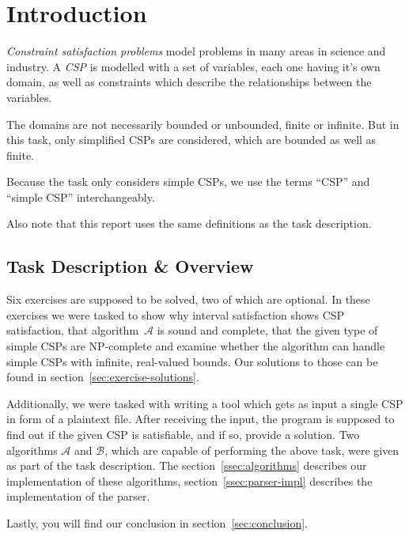 \section{Introduction}

\emph{Constraint satisfaction problems} model problems in many areas in science and industry.
A \emph{CSP} is modelled with a set of variables, each one having it's own domain, as well as constraints which describe the relationships between the variables.~\cite{MF19}

The domains are not necessarily bounded or unbounded, finite or infinite.
But in this task, only simplified CSPs are considered, which are bounded as well as finite.~\cite{MF19}

Because the task only considers simple CSPs, we use the terms ``CSP'' and ``simple CSP'' interchangeably.

Also note that this report uses the same definitions as the task description.

\subsection{Task Description \& Overview}

Six exercises are supposed to be solved, two of which are optional.
In these exercises we were tasked to show why interval satisfaction shows CSP satisfaction, that algorithm~$\mathcal{A}$ is sound and complete, that the given type of simple CSPs are NP-complete and examine whether the algorithm can handle simple CSPs with infinite, real-valued bounds.
Our solutions to those can be found in section~\ref{sec:exercise-solutions}.

Additionally, we were tasked with writing a tool which gets as input a single CSP in form of a plaintext file.
After receiving the input, the program is supposed to find out if the given CSP is satisfiable, and if so, provide a solution.
Two algorithms $\mathcal{A}$ and $\mathcal{B}$, which are capable of performing the above task, were given as part of the task description.
The section~\ref{ssec:algorithms} describes our implementation of these algorithms, section~\ref{ssec:parser-impl} describes the implementation of the parser.

Lastly, you will find our conclusion in section~\ref{sec:conclusion}.
